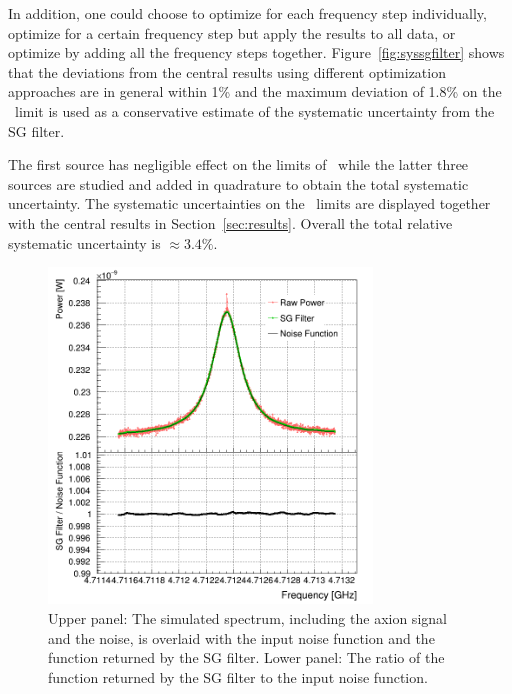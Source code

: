 \begin{itemize}
In addition, one could choose to optimize for each frequency step 
individually, optimize for a certain frequency step but apply the results to 
all data, or optimize by adding all the frequency steps together. 
Figure~\ref{fig:syssgfilter} shows that 
the deviations from the central results using different optimization 
approaches are in general within 1\% and the 
maximum deviation of 1.8\% 
on the \gagg\ limit is used as a conservative estimate of the systematic 
uncertainty from the SG filter. 

\end{itemize}

The first source has negligible effect on the limits of \gagg\ while the 
latter three sources are studied and added in quadrature to obtain the total 
systematic uncertainty. The systematic uncertainties on the \gagg\ limits 
are displayed together with the central results in Section~\ref{sec:results}. 
Overall the total relative systematic uncertainty is $\approx 3.4\%$.

\begin{figure} [htbp]
  \centering
  \includegraphics[width=8.6cm]{figures/GeneratedSpectrum_Optimized_SGFilter_NPar_3_Window_141.png}
  \caption{Upper panel: 
 The simulated spectrum, including the axion signal and the noise, 
 is overlaid with the input noise function and the function returned by 
 the SG filter. Lower panel: The ratio of the function returned by the SG 
 filter to the input noise function.}
  \label{fig:sgcompare}
\end{figure}



